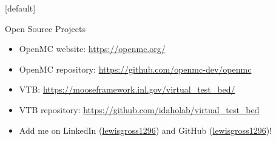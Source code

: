 \documentclass[9pt,t,aspectratio=169]{beamer}
\makeatletter
\newenvironment{withoutheadline}{
       \setbeamertemplate{headline}[default]
       \def\beamer@entrycode{\vspace*{-\headheight}}
    }{}
\makeatother
\begin{document}
\begin{withoutheadline}
    \begin{frame}{Open Source Projects}
        \begin{itemize}
            \item OpenMC website: \href{https://openmc.org/}{https://openmc.org/}
            \item OpenMC repository: \href{https://github.com/openmc-dev/openmc}{https://github.com/openmc-dev/openmc}
            \item VTB: \href{https://mooseframework.inl.gov/virtual_test_bed/}{https://mooseframework.inl.gov/virtual\_test\_bed/}
            \item VTB repository: \href{https://github.com/idaholab/virtual_test_bed}{https://github.com/idaholab/virtual\_test\_bed}
            \item Add me on LinkedIn (\href{https://www.linkedin.com/in/lewisgross1296}{lewisgross1296}) and GitHub (\href{https://github.com/lewisgross1296}{lewisgross1296})!
        \end{itemize}
    \end{frame}
\end{withoutheadline}
\end{document}
